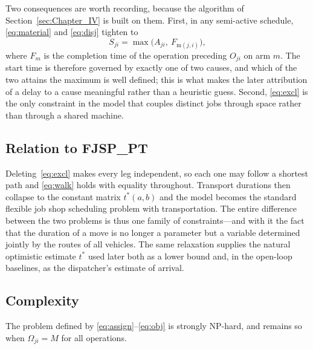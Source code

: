 \documentclass[manuscript,screen,review]{acmart}
\begin{document}
Two consequences are worth recording, because the algorithm of
Section~\ref{sec:Chapter_IV} is built on them. First, in any semi-active
schedule, \eqref{eq:material} and \eqref{eq:disj} tighten to
\begin{equation}
\label{eq:bind}
S_{ji}=\max\bigl(A_{ji},\ F_{\mathrm{m}(j,i)}\bigr),
\end{equation}
where $F_m$ is the completion time of the operation preceding $O_{ji}$ on arm
$m$. The start time is therefore governed by exactly one of two causes, and
which of the two attains the maximum is well defined; this is what makes the
later attribution of a delay to a cause meaningful rather than a heuristic
guess. Second, \eqref{eq:excl} is the only constraint in the model that couples
distinct jobs through space rather than through a shared machine.

\subsection{Relation to FJSP\_PT}

Deleting~\eqref{eq:excl} makes every leg independent, so each one may follow a
shortest path and \eqref{eq:walk} holds with equality throughout. Transport
durations then collapse to the constant matrix $t^{*}(a,b)$ and the model
becomes the standard flexible job shop scheduling problem with transportation.
The entire difference between the two problems is thus one family of
constraints---and with it the fact that the duration of a move is no longer a
parameter but a variable determined jointly by the routes of all vehicles. The
same relaxation supplies the natural optimistic estimate $t^{*}$ used later both
as a lower bound and, in the open-loop baselines, as the dispatcher's estimate
of arrival.

\subsection{Complexity}

\begin{proposition}
\label{prop:np_hard}
The problem defined by \eqref{eq:assign}--\eqref{eq:obj} is strongly NP-hard,
and remains so when $\Omega_{ji}=M$ for all operations.
\end{proposition}
\end{document}
